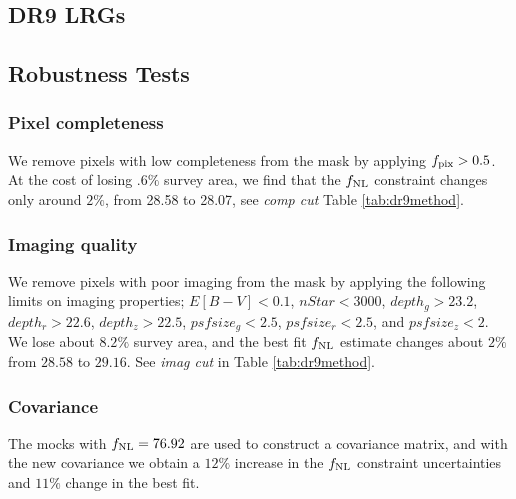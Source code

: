 \subsection{DR9 LRGs}
\subsection{Robustness Tests}
\subsubsection{Pixel completeness}
We remove pixels with low completeness from the mask by applying $f_{\rm pix}>0.5$. At the cost of losing $.6\%$ survey area, we find that the $f_{\rm NL}$ constraint changes only around $2\%$, from 28.58 to 28.07, see \textit{comp cut} Table \ref{tab:dr9method}.


\subsubsection{Imaging quality}
We remove pixels with poor imaging from the mask by applying the following limits on imaging properties; $E[B-V]<0.1$, $nStar < 3000$, $depth_{g} > 23.2$, $depth_{r} > 22.6$, $depth_{z} > 22.5$, $psfsize_{g}<2.5$, $psfsize_{r}<2.5$, and $psfsize_{z}<2$. We lose about $8.2\%$ survey area, and the best fit $f_{\rm NL}$ estimate changes about $2\%$ from $28.58$ to $29.16$. See \textit{imag cut} in Table \ref{tab:dr9method}.


\subsubsection{Covariance}
The mocks with $f_{\rm NL}=76.92$ are used to construct a covariance matrix, and with the new covariance we obtain a $12\%$ increase in the $f_{\rm NL}$ constraint uncertainties and $11\%$ change in the best fit.

